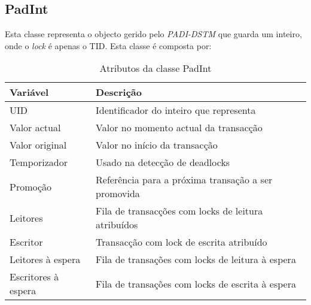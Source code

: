 \subsection{PadInt}

Esta classe representa o objecto gerido pelo \textit{PADI-DSTM} que guarda um inteiro, onde o \textit{lock} é apenas o TID. Esta classe é composta por:
\begin{table}[H]
\centering
\begin{tabular}{| p{2cm} | p{} |}
\hline
\textbf{Variável} & \textbf{Descrição} \\
\hline
UID & Identificador do inteiro que representa \\
\hline
Valor actual & Valor no momento actual da transacção \\
\hline
Valor original & Valor no início da transacção \\
\hline
Temporizador & Usado na detecção de deadlocks \\
\hline
Promoção & Referência para a próxima transação a ser promovida\\
\hline
Leitores & Fila de transacções com locks de leitura atribuídos \\
\hline
Escritor & Transacção com lock de escrita atribuído\\
\hline
Leitores à espera & Fila de transações com locks de leitura à espera \\
\hline
Escritores à espera & Fila de transações com locks de escrita à espera\\
\hline
\end{tabular}
\caption{Atributos da classe PadInt}\label{tab:padint}
\end{table}
